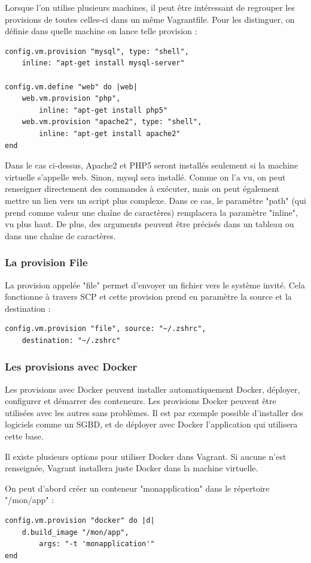 \documentclass[12pt,a4paper]{article}
\begin{document}
Lorsque l'on utilise plusieurs machines, il peut être intéressant de regrouper les provisions de toutes celles-ci dans un même Vagrantfile. Pour les distinguer, on définie dans quelle machine on lance telle provision :
\begin{lstlisting}
config.vm.provision "mysql", type: "shell", 
	inline: "apt-get install mysql-server"

config.vm.define "web" do |web|
	web.vm.provision "php", 
		inline: "apt-get install php5"
	web.vm.provision "apache2", type: "shell", 
		inline: "apt-get install apache2"
end
\end{lstlisting}

Dans le cas ci-dessus, Apache2 et PHP5 seront installés seulement si la machine virtuelle s'appelle web. Sinon, mysql sera installé. Comme on l'a vu, on peut renseigner directement des commandes à exécuter, mais on peut également mettre un lien vers un script plus complexe. Dans ce cas, le paramètre "path" (qui prend comme valeur une chaîne de caractères) remplacera la paramètre "inline", vu plus haut. De plus, des arguments peuvent être précisés dans un tableau ou dans une chaîne de caractères.

\subsubsection{La provision File}
La provision appelée "file" permet d'envoyer un fichier vers le système invité. Cela fonctionne à travers SCP et cette provision prend en paramètre la source et la destination :
\begin{lstlisting}
config.vm.provision "file", source: "~/.zshrc", 
	destination: "~/.zshrc"
\end{lstlisting}

\subsubsection{Les provisions avec Docker}
Les provisions avec Docker peuvent installer automatiquement Docker, déployer, configurer et démarrer des conteneurs. Les provisions Docker peuvent être utilisées avec les autres sans problèmes. Il est par exemple possible d'installer des logiciels comme un SGBD, et de déployer avec Docker l'application qui utilisera cette base.

Il existe plusieurs options pour utiliser Docker dans Vagrant. Si aucune n'est renseignée, Vagrant installera juste Docker dans la machine virtuelle.

On peut d'abord créer un conteneur "monapplication" dans le répertoire "/mon/app" :
\begin{lstlisting}
config.vm.provision "docker" do |d|
    d.build_image "/mon/app",
		args: "-t 'monapplication'"
end
\end{lstlisting}
\end{document}

